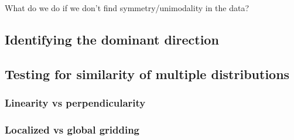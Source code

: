 \documentclass[../../ArchStats.tex]{subfiles}
\begin{document}
What do we do if we don't find symmetry/unimodality in the data?

\subsection{Identifying the dominant direction}


\subsection{Testing for similarity of multiple distributions}

\subsubsection{Linearity vs perpendicularity}

\subsubsection{Localized vs global gridding}
\end{document}
